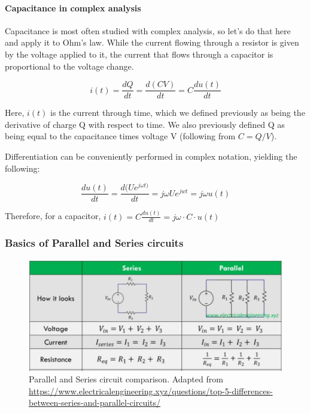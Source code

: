 \paragraph{Capacitance in complex analysis}
Capacitance is most often studied with complex analysis, so let's do that here and apply it to Ohm's law. While the current flowing through a resistor is given by the voltage applied to it, the current that flows through a capacitor is proportional to the voltage change. 

\begin{equation}
    i(t) = \frac{dQ}{dt} = \frac{d(C V)}{dt} = C\frac{du(t)}{dt}
\end{equation}

Here, $i(t)$ is the current through time, which we defined previously as being the derivative of charge Q with respect to time. We also previously defined Q as being equal to the capacitance times voltage V (following from $C = Q/V$). 

Differentiation can be conveniently performed in complex notation, yielding the following: 

\begin{equation}
    \frac{du(t)}{dt} = \frac{d (Ue^{j\omega t)}}{dt} = j\omega U e^{jwt} = j\omega u(t) 
\end{equation}

Therefore, for a capacitor, $i(t) = C\frac{du(t)}{dt} = j\omega \cdot C \cdot u(t)$

\subsubsection{Basics of Parallel and Series circuits}

\begin{figure}[H]
    \centering
    \includegraphics[width=0.75\linewidth]{../../Figures/Parallel_Series.PNG}
    \caption{Parallel and Series circuit comparison. Adapted from \url{https://www.electricalengineering.xyz/questions/top-5-differences-between-series-and-parallel-circuits/}}
    \label{fig:Parallel_Series}
\end{figure}

